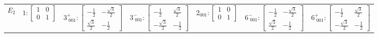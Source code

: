 \documentclass[fleqn,8pt,landscape]{jsarticle}
\begin{document}
\begin{longtable}{ccccccc}
$ E_{2} $ & $ 1:\begin{bmatrix} 1 & 0 \\ 0 & 1 \end{bmatrix} $ & $ 3^{+}_{\,\,001}:\begin{bmatrix} - \frac{1}{2} & - \frac{\sqrt{3}}{2} \\ \frac{\sqrt{3}}{2} & - \frac{1}{2} \end{bmatrix} $ & $ 3^{-}_{\,\,001}:\begin{bmatrix} - \frac{1}{2} & \frac{\sqrt{3}}{2} \\ - \frac{\sqrt{3}}{2} & - \frac{1}{2} \end{bmatrix} $ & $ 2{}_{001}:\begin{bmatrix} 1 & 0 \\ 0 & 1 \end{bmatrix} $ & $ 6^{-}_{\,\,001}:\begin{bmatrix} - \frac{1}{2} & - \frac{\sqrt{3}}{2} \\ \frac{\sqrt{3}}{2} & - \frac{1}{2} \end{bmatrix} $ & $ 6^{+}_{\,\,001}:\begin{bmatrix} - \frac{1}{2} & \frac{\sqrt{3}}{2} \\ - \frac{\sqrt{3}}{2} & - \frac{1}{2} \end{bmatrix} $ \\
\end{longtable}
\end{document}
